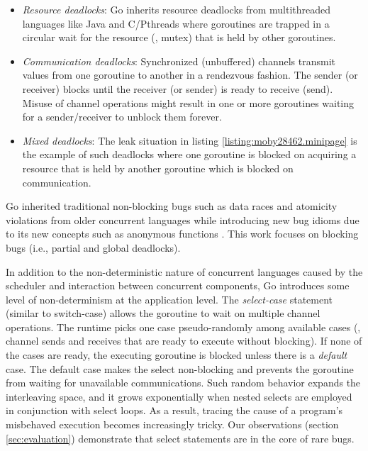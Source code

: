 \begin{itemize}
  \item \textit{Resource deadlocks}: Go inherits resource deadlocks from multithreaded languages like Java and C/Pthreads where goroutines are trapped in a circular wait for the resource (\eg, mutex) that is held by other goroutines.
  \item \textit{Communication deadlocks}: Synchronized (unbuffered) channels transmit values from one goroutine to another in a rendezvous fashion. The sender (or receiver) blocks until the receiver (or sender) is ready to receive (send). Misuse of channel operations might result in one or more goroutines waiting for a sender/receiver to unblock them forever.
  \item \textit{Mixed deadlocks}: The leak situation in listing \ref{listing:moby28462.minipage} is the example of such deadlocks where one goroutine is blocked on acquiring a resource that is held by another goroutine which is blocked on communication.
\end{itemize}

Go inherited traditional non-blocking bugs such as data races and atomicity violations from older concurrent languages while introducing new bug idioms due to its new concepts such as anonymous functions \cite{tu-concurrentBugs-asplos19}.
%
This work focuses on blocking bugs (i.e., partial and global deadlocks).

In addition to the non-deterministic nature of concurrent languages caused by the scheduler and interaction between concurrent components, Go introduces some level of non-determinism at the application level.
%
The \textit{select-case} statement (similar to switch-case) allows the goroutine to wait on multiple channel operations.
%
The runtime picks one case pseudo-randomly among available cases (\ie, channel sends and receives that are ready to execute without blocking).
%
If none of the cases are ready, the executing goroutine is blocked unless there is a \textit{default} case.
%
The default case makes the select non-blocking and prevents the goroutine from waiting for unavailable communications.
%
Such random behavior expands the interleaving space, and it grows exponentially when nested selects are employed in conjunction with select loops.
%
As a result, tracing the cause of a program's misbehaved execution becomes increasingly tricky.
%
Our observations (section \ref{sec:evaluation}) demonstrate that select statements are in the core of rare bugs.


